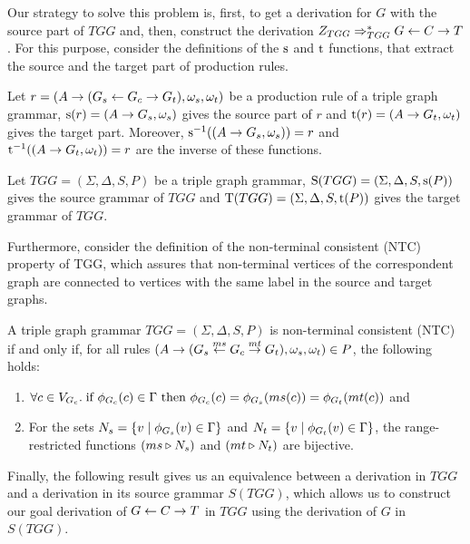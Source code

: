 \documentclass[]{report}
\begin{document}
Our strategy to solve this problem is, first, to get a derivation for $G$ with the source part of $TGG$ and, then, construct the derivation $\startTG{TGG} \tderivtr{TGG} G \ms{} C \mt{} T$. For this purpose, consider the definitions of the $\source$ and $\target$ functions, that extract the source and the target part of production rules.

\begin{definition}
	\label{def:source}
	Let $r = (A \pro (G_s \ms{} G_c \mt{} G_t), \omega_s, \omega_t)$ be a production rule of a triple graph grammar, $\source(r) = (A \pro G_s,\omega_s)$ gives the source part of $r$ and $\target(r) = (A \pro G_t,\omega_t)$ gives the target part. Moreover, $\source^{-1}((A \pro G_s,\omega_s)) = r$ and $\target^{-1}((A \pro G_t,\omega_t)) = r$ are the inverse of these functions.
\end{definition}

\begin{definition}
	\label{def:Source}
	Let $TGG = (\Sigma, \Delta, S, P)$ be a triple graph grammar, $\Source(TGG) = (\Sigma, \Delta, S, \source(P))$ gives the source grammar of $TGG$ and $\Target(TGG) = (\Sigma, \Delta, S, \target(P))$ gives the target grammar of $TGG$.
\end{definition}

Furthermore, consider the definition of the non-terminal consistent (NTC) property of TGG, which assures that non-terminal vertices of the correspondent graph are connected to vertices with the same label in the source and target graphs.

\begin{definition}
	A triple graph grammar $TGG = (\Sigma, \Delta, S, P)$ is non-terminal consistent (NTC) if and only if, for all rules $(A \pro (G_s \ms{ms} G_c \mt{mt} G_t), \omega_s, \omega_t) \in P$, the following holds:
	\begin{enumerate}
		\item $\forall c \in V_{G_c} \. \text{if } \phi_{G_c}(c) \in \Gamma \text{ then } \phi_{G_c}(c) = \phi_{G_s}(ms(c)) = \phi_{G_t}(mt(c))$ and
		\item For the sets $N_s = \{v \st \phi_{G_s}(v) \in \Gamma\}$ and $N_t = \{v \st \phi_{G_t}(v) \in \Gamma\}$, the range-restricted functions $(ms \rrestr N_s)$ and $(mt \rrestr N_t)$ are bijective.
	\end{enumerate}
\end{definition}

Finally, the following result gives us an equivalence between a derivation in $TGG$ and a derivation in its source grammar $S(TGG)$, which allows us to construct our goal derivation of $G \ms{} C \mt{} T$ in $TGG$ using the derivation of $G$ in $S(TGG)$.
\end{document}
